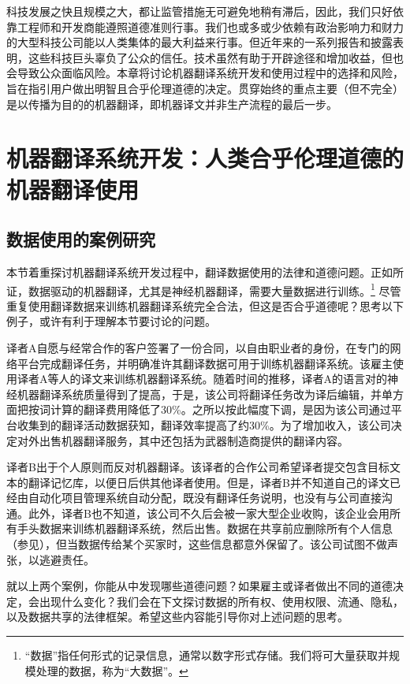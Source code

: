\documentclass[output=paper]{langscibook}
\begin{document}
科技发展之快且规模之大，都让监管措施无可避免地稍有滞后，因此，我们只好依靠工程师和开发商能遵照道德准则行事。我们也或多或少依赖有政治影响力和财力的大型科技公司能以人类集体的最大利益来行事。但近年来的一系列报告和披露表明，这些科技巨头辜负了公众的信任。技术虽然有助于开辟途径和增加收益，但也会导致公众面临风险。本章将讨论机器翻译系统开发和使用过程中的选择和风险，旨在指引用户做出明智且合乎伦理道德的决定。贯穿始终的重点主要（但不完全）是以传播为目的的机器翻译，即机器译文并非生产流程的最后一步。


\section{机器翻译系统开发：人类合乎伦理道德的机器翻译使用}\label{sec:moorkens:2}
\subsection{数据使用的案例研究}\label{sec:moorkens:2.1}

本节着重探讨机器翻译系统开发过程中，翻译数据使用的法律和道德问题。正如所证，数据驱动的机器翻译，尤其是神经机器翻译，需要大量数据进行训练。\footnote{“数据”指任何形式的记录信息，通常以数字形式存储。我们将可大量获取并规模处理的数据，称为“大数据”。} 尽管重复使用翻译数据来训练机器翻译系统完全合法，但这是否合乎道德呢？思考以下例子，或许有利于理解本节要讨论的问题。

译者A自愿与经常合作的客户签署了一份合同，以自由职业者的身份，在专门的网络平台完成翻译任务，并明确准许其翻译数据可用于训练机器翻译系统。该雇主使用译者A等人的译文来训练机器翻译系统。随着时间的推移，译者A的语言对的神经机器翻译系统质量得到了提高，于是，该公司将翻译任务改为译后编辑，并单方面把按词计算的翻译费用降低了30\%。之所以按此幅度下调，是因为该公司通过平台收集到的翻译活动数据获知，翻译效率提高了约30\%。为了增加收入，该公司决定对外出售机器翻译服务，其中还包括为武器制造商提供的翻译内容。

译者B出于个人原则而反对机器翻译。该译者的合作公司希望译者提交包含目标文本的翻译记忆库，以便日后供其他译者使用。但是，译者B并不知道自己的译文已经由自动化项目管理系统自动分配，既没有翻译任务说明，也没有与公司直接沟通。此外，译者B也不知道，该公司不久后会被一家大型企业收购，该企业会用所有手头数据来训练机器翻译系统，然后出售。数据在共享前应删除所有个人信息（参见），但当数据传给某个买家时，这些信息都意外保留了。该公司试图不做声张，以逃避责任。

就以上两个案例，你能从中发现哪些道德问题？如果雇主或译者做出不同的道德决定，会出现什么变化？我们会在下文探讨数据的所有权、使用权限、流通、隐私，以及数据共享的法律框架。希望这些内容能引导你对上述问题的思考。
\end{document}
